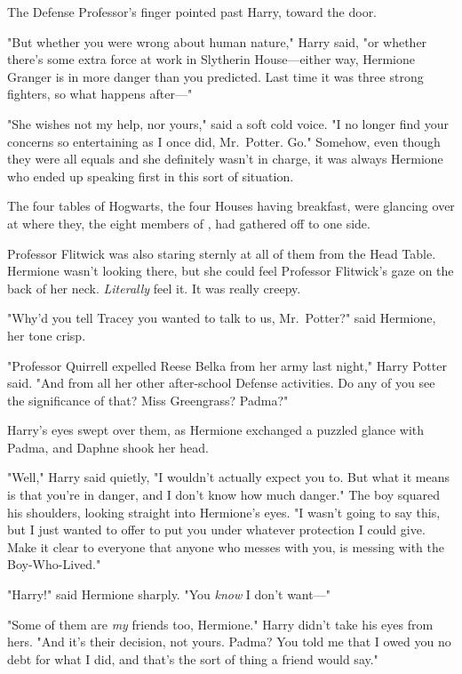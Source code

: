 The Defense Professor's finger pointed past Harry, toward the door.

"But whether you were wrong about human nature," Harry said, "or whether
there's some extra force at work in Slytherin House—either way, Hermione
Granger is in more danger than you predicted. Last time it was three strong
fighters, so what happens after—"

"She wishes not my help, nor yours," said a soft cold voice. "I no longer find
your concerns so entertaining as I once did, Mr.~Potter. Go."
\sbreak
Somehow, even though they were all equals and she definitely wasn't in charge,
it was always Hermione who ended up speaking first in this sort of situation.

The four tables of Hogwarts, the four Houses having breakfast, were glancing
over at where they, the eight members of \SPHEW, had gathered off to one
side.

Professor Flitwick was also staring sternly at all of them from the Head Table.
Hermione wasn't looking there, but she could feel Professor Flitwick's gaze on
the back of her neck. \emph{Literally} feel it. It was really creepy.

"Why'd you tell Tracey you wanted to talk to us, Mr.~Potter?" said Hermione,
her tone crisp.

"Professor Quirrell expelled Reese Belka from her army last night," Harry
Potter said. "And from all her other after-school Defense activities. Do any of
you see the significance of that? Miss Greengrass? Padma?"

Harry's eyes swept over them, as Hermione exchanged a puzzled glance with
Padma, and Daphne shook her head.

"Well," Harry said quietly, "I wouldn't actually expect you to. But what it
means is that you're in danger, and I don't know how much danger." The boy
squared his shoulders, looking straight into Hermione's eyes. "I wasn't going
to say this, but{\el} I just wanted to offer to put you under whatever
protection I could give. Make it clear to everyone that anyone who messes with
you, is messing with the Boy-Who-Lived."

"Harry!" said Hermione sharply. "You \emph{know} I don't want—"

"Some of them are \emph{my} friends too, Hermione." Harry didn't take his eyes
from hers. "And it's their decision, not yours. Padma? You told me that I owed
you no debt for what I did, and that's the sort of thing a friend would say."

